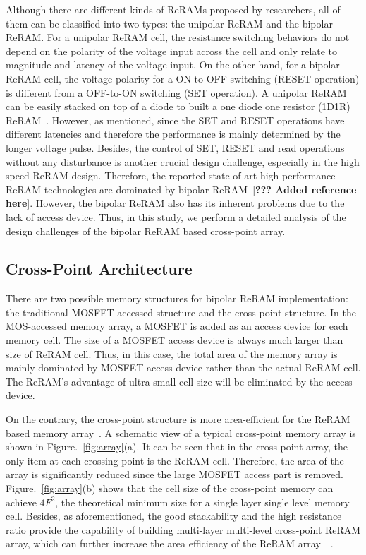 Although there are different kinds of ReRAMs proposed by researchers, all of them can be classified into two types: the unipolar ReRAM and the bipolar ReRAM. For a unipolar ReRAM cell, the resistance switching behaviors do not depend on the polarity of the voltage input across the cell and only relate to magnitude and latency of the voltage input. On the other hand, for a bipolar ReRAM cell, the voltage polarity for a ON-to-OFF switching (RESET operation) is different from a OFF-to-ON switching (SET operation). A unipolar ReRAM can be easily stacked on top of a diode to built a one diode one resistor (1D1R) ReRAM~\cite{memristor:1D1R}. However, as mentioned, since the SET and RESET operations have different latencies and therefore the performance is mainly determined by the longer voltage pulse. Besides, the control of SET, RESET and read operations without any disturbance is another crucial design challenge, especially in the high speed ReRAM design. Therefore, the reported state-of-art high performance ReRAM technologies are dominated by bipolar ReRAM~[\textbf{??? Added reference here}]. However, the bipolar ReRAM also has its inherent problems due to the lack of access device. Thus, in this study, we perform a detailed analysis of the design challenges of the bipolar ReRAM based cross-point array.

\subsection{Cross-Point Architecture}
There are two possible memory structures for bipolar ReRAM implementation: the traditional MOSFET-accessed structure and the cross-point structure. In the MOS-accessed memory array, a MOSFET is added as an access device for each memory cell. The size of a MOSFET access device is always much larger than size of ReRAM cell. Thus, in this case, the total area of the memory array is mainly dominated by MOSFET access device rather than the actual ReRAM cell. The ReRAM's advantage of ultra small cell size will be eliminated by the access device.

On the contrary, the cross-point structure is more area-efficient for the ReRAM based memory array~\cite{memristor:Cong}. A schematic view of a typical cross-point memory array is shown in Figure.~\ref{fig:array}(a). It can be seen that in the cross-point array, the only item at each crossing point is the ReRAM cell. Therefore, the area of the array is significantly reduced since the large MOSFET access part is removed. Figure.~\ref{fig:array}(b) shows that the cell size of the cross-point memory can achieve $4F^2$, the theoretical minimum size for a single layer single level memory cell. Besides, as aforementioned, the good stackability and the high resistance ratio provide the capability of building multi-layer multi-level cross-point ReRAM array, which can further increase the area efficiency of the ReRAM array~\cite{memristor:ISSCC2011_ITRI}~\cite{memristor:IEDM08_3D}.

